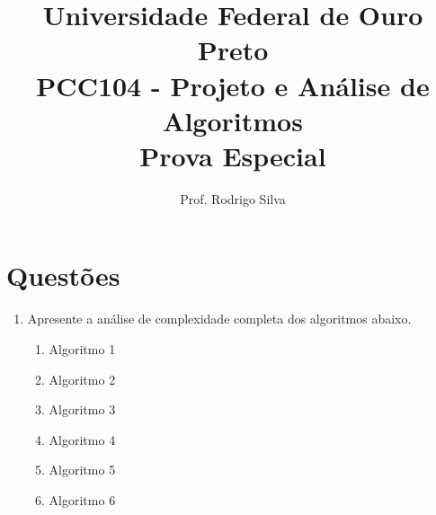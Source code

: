 \documentclass{article}
\title{\vspace{-2 cm}Universidade Federal de Ouro Preto \\ PCC104 - Projeto e Análise de Algoritmos \\ Prova Especial}
\author{Prof. Rodrigo Silva}
\begin{document}
\maketitle

\section*{Questões}

\begin{enumerate}

    \item Apresente a análise de complexidade completa dos algoritmos abaixo. 
    
    \begin{enumerate}

        \item Algoritmo 1
        \begin{figure}[!ht]
            
        \end{figure}

        \item Algoritmo 2
        \begin{figure}[!ht]
            
        \end{figure}

        \item Algoritmo 3
        \begin{figure}[!ht]
            
        \end{figure}

        \pagebreak

        \item Algoritmo 4
        \begin{figure}[!ht]
            
        \end{figure}

        \item Algoritmo 5
        \begin{figure}[!ht]
            
        \end{figure}

        \item Algoritmo 6
        \begin{figure}[!ht]
            
        \end{figure}


\end{enumerate}
\end{enumerate}
\end{document}

